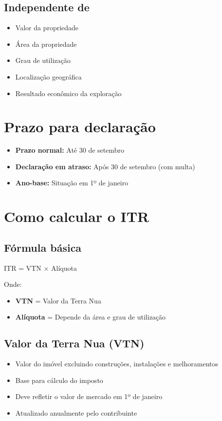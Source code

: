 \documentclass[12pt,a4paper]{article}
\begin{document}
\subsection{Independente de}
\begin{itemize}
    \item Valor da propriedade
    \item Área da propriedade
    \item Grau de utilização
    \item Localização geográfica
    \item Resultado econômico da exploração
\end{itemize}

\section{Prazo para declaração}

\begin{itemize}
    \item \textbf{Prazo normal:} Até 30 de setembro
    \item \textbf{Declaração em atraso:} Após 30 de setembro (com multa)
    \item \textbf{Ano-base:} Situação em 1º de janeiro
\end{itemize}

\section{Como calcular o ITR}

\subsection{Fórmula básica}
ITR = VTN × Alíquota

Onde:
\begin{itemize}
    \item \textbf{VTN} = Valor da Terra Nua
    \item \textbf{Alíquota} = Depende da área e grau de utilização
\end{itemize}

\subsection{Valor da Terra Nua (VTN)}
\begin{itemize}
    \item Valor do imóvel excluindo construções, instalações e melhoramentos
    \item Base para cálculo do imposto
    \item Deve refletir o valor de mercado em 1º de janeiro
    \item Atualizado anualmente pelo contribuinte
\end{itemize}
\end{document}
